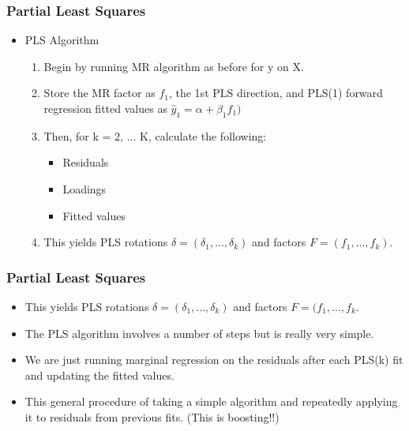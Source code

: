 \documentclass[
  shownotes,
  xcolor={svgnames},
  hyperref={colorlinks,citecolor=DarkBlue,linkcolor=DarkRed,urlcolor=DarkBlue}
  , aspectratio=169]{beamer}
\begin{document}
\begin{frame}[fragile]
\frametitle{Partial Least Squares }

\begin{itemize}
\item PLS Algorithm 
\medskip
\begin{enumerate}
\item Begin by running MR algorithm as before for y on X.
\medskip 
\item Store the MR factor as $f_1$, the 1st PLS direction, and PLS(1) forward regression fitted values as $\hat{y}_1=\alpha + \beta_1 f_1)$
\medskip 
\item Then, for k = 2, ... K, calculate the following:    
  \begin{itemize}
    \item Residuals     
    \item Loadings     
    \item Fitted values 
  \end{itemize}
\item This yields PLS rotations $\delta=(\delta_1,...,\delta_k)$ and factors $F=(f_1,...,f_k)$.
\end{enumerate}
\end{itemize}

\end{frame}
\begin{frame}[fragile]
\frametitle{Partial Least Squares }

\begin{itemize}
  \item This yields PLS rotations $\delta=(\delta_1,...,\delta_k)$ and factors $F=(f_1,...,f_k$.
\medskip 
\item The PLS algorithm involves a number of steps but is really very simple.
\medskip 
\item  We are just running marginal regression on the residuals after each PLS(k) fit and updating the fitted values.
\medskip 
 \item   This general procedure of taking a simple algorithm and repeatedly applying it to residuals from previous fits. (This is boosting!!) 
\end{itemize}


\end{frame}
\end{document}

